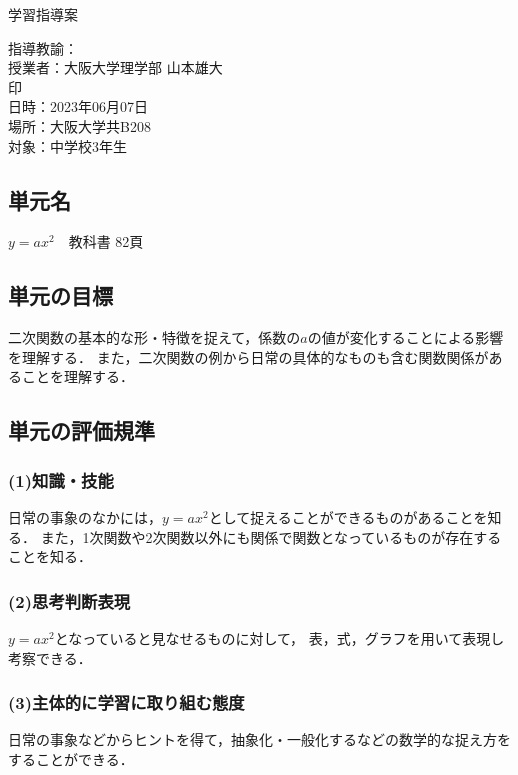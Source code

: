\documentclass{ltjsarticle}
\begin{document}
\begin{center}
  \Large{学習指導案}
\end{center}
\hfill 指導教諭：\\
\hfill 授業者：大阪大学理学部 山本雄大\\
\hfill 印\\
日時：2023年06月07日\\
場所：大阪大学共B208\\
対象：中学校3年生\\
\subsection{単元名}\vspace*{-3mm}
  \(y=ax^2\)\ \ 教科書 82頁
  \vspace*{-3mm}
\subsection{単元の目標}\vspace*{-3mm}
  二次関数の基本的な形・特徴を捉えて，係数の\(a\)の値が変化することによる影響を理解する．
  また，二次関数の例から日常の具体的なものも含む関数関係があることを理解する．
  \vspace*{-3mm}
\subsection{単元の評価規準}\vspace*{-3mm}
\subsubsection*{(1)知識・技能}
  日常の事象のなかには，\(y=ax^2\)として捉えることができるものがあることを知る．
  また，1次関数や2次関数以外にも関係で関数となっているものが存在することを知る．
  \vspace*{-3mm}
\subsubsection*{(2)思考判断表現}
  \(y=ax^2\)となっていると見なせるものに対して，
  表，式，グラフを用いて表現し考察できる．
  \vspace*{-3mm}
\subsubsection*{(3)主体的に学習に取り組む態度}
  日常の事象などからヒントを得て，抽象化・一般化するなどの数学的な捉え方をすることができる．
  \vspace*{-3mm}
\end{document}
